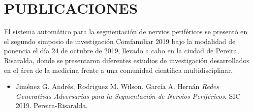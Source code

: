 \chapter{PUBLICACIONES}
El sistema automático para la segmentación de nervios periféricos se presentó en el segundo simposio de investigación Comfamiliar 2019 bajo la modalidad de ponencia el día 24 de octubre de 2019, llevado a cabo en la ciudad de Pereira, Risaralda, donde se presentaron diferentes estudios de investigación desarrollados en el área de la medicina frente a una comunidad científica multidisciplinar.

\begin{itemize}
	\item Jiménez G. Andrés, Rodriguez M. Wilson, García A. Hernán \textit{Redes Generativas Adversarias para la Segmentación de Nervios Periféricos.} SIC 2019. Pereira-Risaralda.
\end{itemize}